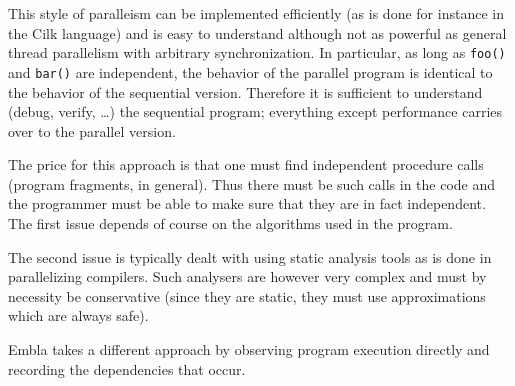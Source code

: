This style of paralleism can be implemented efficiently (as is done
for instance in the Cilk language) and is easy to understand although
not as powerful as general thread parallelism with arbitrary
synchronization. In particular, as long as {\tt foo()} and {\tt bar()}
are independent, the behavior of the parallel program is identical to
the behavior of the sequential version. Therefore it is sufficient to
understand (debug, verify, \ldots) the sequential program; everything
except performance carries over to the parallel version.

The price for this approach is that one must find independent
procedure calls (program fragments, in general). Thus there must be
such calls in the code and the programmer must be able to make sure
that they are in fact independent. The first issue depends of course
on the algorithms used in the program.

The second issue is typically
dealt with using static analysis tools as is done in parallelizing
compilers. Such analysers are however very complex and must by
necessity be conservative (since they are static, they must use
approximations which are always safe).

Embla takes a different approach by observing program execution
directly and recording the dependencies that occur.



